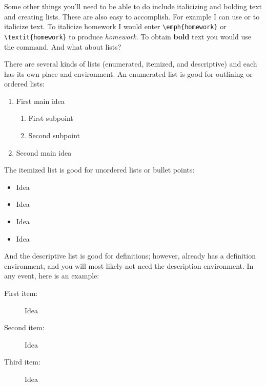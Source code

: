 Some other things you'll need to be able to do include italicizing and bolding text and creating lists. These are also easy to accomplish. For example I can use  or  to italicize text. To italicize homework I would enter \verb|\emph{homework}| or \verb|\textit{homework}| to produce \textit{homework}. To obtain \textbf{bold} text you would use the  command. And what about lists?

There are several kinds of lists (enumerated, itemized, and descriptive) and each has its own place and environment. An enumerated list is good for outlining or ordered lists:

\begin{singlespace}
\begin{example}
\begin{enumerate}
\item First main idea
\begin{enumerate}
\item First subpoint
\item\label{enum:1b} Second subpoint
\end{enumerate}
\item Second main idea
\end{enumerate}
\end{example}
\end{singlespace}

The itemized list is good for unordered lists or bullet points:

\begin{singlespace}
\begin{example}
\begin{itemize}
\item Idea
\item Idea
\item Idea
\item Idea
\end{itemize}
\end{example}
\end{singlespace}

And the descriptive list is good for definitions; however,  already has a definition environment, and you will most likely not need the description environment. In any event, here is an example:

\begin{singlespace}
\begin{example}
\begin{description}
\item[First item:] Idea
\item[Second item:] Idea
\item[Third item:] Idea
\end{description}
\end{example}
\end{singlespace}

